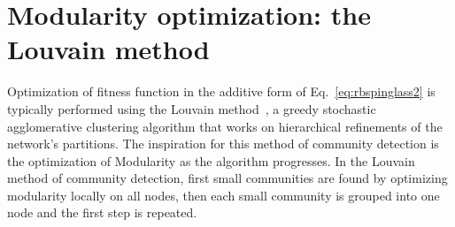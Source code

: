 
\section{Modularity optimization: the Louvain method}\label{sec:louvain_method}
Optimization of fitness function in the additive form of Eq.~\ref{eq:rbspinglass2} is typically performed using the Louvain method~\cite{blondel2008}, a greedy stochastic agglomerative clustering algorithm that works on hierarchical refinements of the network's partitions. The inspiration for this method of community detection is the optimization of Modularity as the algorithm progresses. In the Louvain method of community detection, first small communities are found by optimizing modularity locally on all nodes, then each small community is grouped into one node and the first step is repeated.

